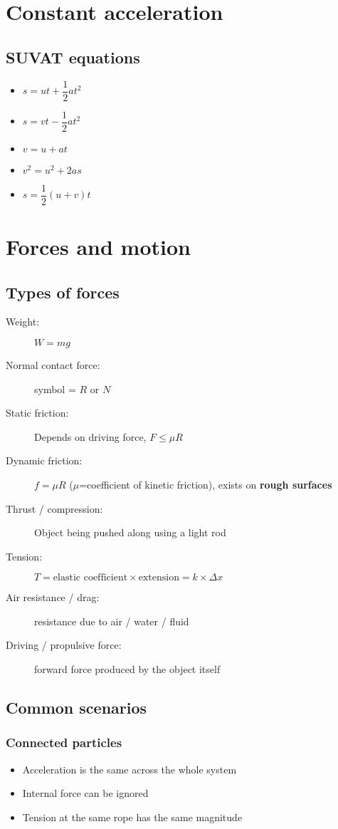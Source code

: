 \chapter{Constant acceleration}
\section{SUVAT equations}
\begin{itemize}
	\item $s=ut+\dfrac{1}{2}at^2$
	\item $s=vt-\dfrac{1}{2}at^2$
	\item $v=u+at$
	\item $v^2=u^2+2as$
	\item $s=\dfrac{1}{2}(u+v)t$
\end{itemize}

\chapter{Forces and motion}
\section{Types of forces}
\begin{description}
	\item[Weight:] $W=mg$
	\item[Normal contact force:] symbol = $R$ or $N$
	\item[Static friction:] Depends on driving force, $F\leq \mu R$
	\item[Dynamic friction:] $f=\mu R$ ($\mu$=coefficient of kinetic friction), exists on \textbf{rough surfaces}
	\item[Thrust / compression:] Object being pushed along using a light rod
	\item[Tension:] $T=\text{elastic coefficient}\times\text{extension}=k\times\Delta x$
	\item[Air resistance / drag:] resistance due to air / water / fluid
	\item[Driving / propulsive force:] forward force produced by the object itself
\end{description}

\section{Common scenarios}
\subsection{Connected particles}
\begin{itemize}
	\item Acceleration is the same across the whole system
	\item Internal force can be ignored
	\item Tension at the same rope has the same magnitude
\end{itemize}

